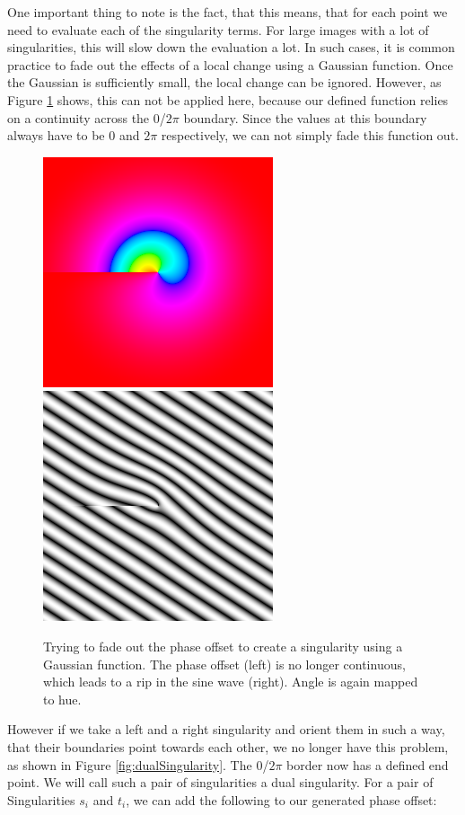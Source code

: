 \documentclass{utue} %
\begin{document}
One important thing to note is the fact, that this means, that for each point we need to evaluate each of the singularity terms. For large images with a lot of singularities, this will slow down the evaluation a lot. In such cases, it is common practice to fade out the effects of a local change using a Gaussian function. Once the Gaussian is sufficiently small, the local change can be ignored. However, as Figure \ref{fig:fadedSingularity} shows, this can not be applied here, because our defined function relies on a continuity across the $0$/$2\pi$ boundary. Since the values at this boundary always have to be $0$ and $2\pi$ respectively, we can not simply fade this function out.
\begin{figure}[ht]
  \centering
  \includegraphics[width=0.45\linewidth]{images/fadedPhase}
  \includegraphics[width=0.45\linewidth]{images/fadedPhaseSineWave}
  \caption{Trying to fade out the phase offset to create a singularity using a Gaussian function. The phase offset (left) is no longer continuous, which leads to a rip in the sine wave (right). Angle is again mapped to hue.}\label{fig:fadedSingularity}
\end{figure}
However if we take a left and a right singularity and orient them in such a way, that their boundaries point towards each other, we no longer have this problem, as shown in Figure \ref{fig:dualSingularity}. The $0$/$2\pi$ border now has a defined end point. We will call such a pair of singularities a dual singularity. For a pair of Singularities $s_i$ and $t_i$, we can add the following to our generated phase offset:
\end{document}
